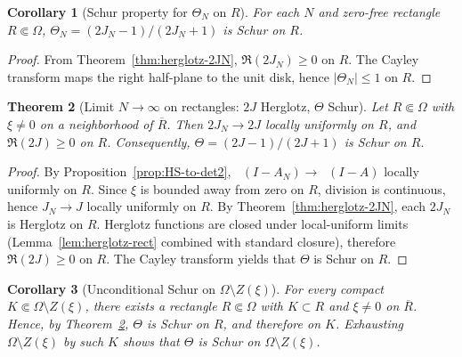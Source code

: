 \documentclass[11pt]{article}
\newtheorem{theorem}{Theorem}
\newtheorem{corollary}[theorem]{Corollary}
\theoremstyle{definition}
\theoremstyle{remark}
\DeclareMathOperator{\dettwo}{det_2}
\begin{document}
\begin{corollary}[Schur property for \(\Theta_N\) on \(R\)]\label{cor:ThetaN-Schur-R}
For each \(N\) and zero-free rectangle \(R\Subset\Omega\), \(\Theta_N=(2J_N-1)/(2J_N+1)\) is Schur on \(R\).
\end{corollary}
\begin{proof}
From Theorem~\ref{thm:herglotz-2JN}, \(\Re(2J_N)\ge 0\) on \(R\). The Cayley transform maps the right half-plane to the unit disk, hence \(|\Theta_N|\le 1\) on \(R\).
\end{proof}

\begin{theorem}[Limit \(N\to\infty\) on rectangles: \(2J\) Herglotz, \(\Theta\) Schur]\label{thm:limit-rect}
Let \(R\Subset\Omega\) with \(\xi\neq 0\) on a neighborhood of \(\overline R\). Then \(2J_N\to 2J\) locally uniformly on \(R\), and \(\Re(2J)\ge 0\) on \(R\). Consequently, \(\Theta=(2J-1)/(2J+1)\) is Schur on \(R\).
\end{theorem}
\begin{proof}
By Proposition~\ref{prop:HS-to-det2}, \(\dettwo(I-A_N)\to \dettwo(I-A)\) locally uniformly on \(R\). Since \(\xi\) is bounded away from zero on \(R\), division is continuous, hence \(J_N\to J\) locally uniformly on \(R\). By Theorem~\ref{thm:herglotz-2JN}, each \(2J_N\) is Herglotz on \(R\). Herglotz functions are closed under local-uniform limits (Lemma~\ref{lem:herglotz-rect} combined with standard closure), therefore \(\Re(2J)\ge 0\) on \(R\). The Cayley transform yields that \(\Theta\) is Schur on \(R\).
\end{proof}

\begin{corollary}[Unconditional Schur on \(\Omega\setminus Z(\xi)\)]\label{cor:Schur-off-zeros}
For every compact \(K\Subset \Omega\setminus Z(\xi)\), there exists a rectangle \(R\Subset\Omega\) with \(K\subset R\) and \(\xi\neq 0\) on \(\overline R\). Hence, by Theorem~\ref{thm:limit-rect}, \(\Theta\) is Schur on \(R\), and therefore on \(K\). Exhausting \(\Omega\setminus Z(\xi)\) by such \(K\) shows that \(\Theta\) is Schur on \(\Omega\setminus Z(\xi)\).
\end{corollary}
\end{document}
